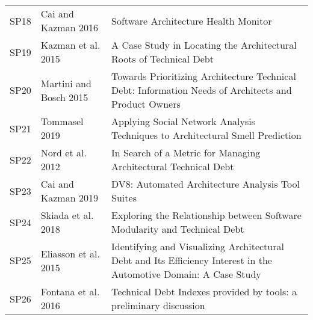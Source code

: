 \begin{tabular}{lll}
 SP18 &                                                      Cai and Kazman 2016 &                                                                                                                                      Software Architecture Health Monitor \\
 SP19 &                                                       Kazman et al. 2015 &                                                                                                        A Case Study in Locating the Architectural Roots of Technical Debt \\
 SP20 &                                                   Martini and Bosch 2015 &                                                                      Towards Prioritizing Architecture Technical Debt: Information Needs of Architects and Product Owners \\
 SP21 &                                                            Tommasel 2019 &                                                                                             Applying Social Network Analysis Techniques to Architectural Smell Prediction \\
 SP22 &                                                         Nord et al. 2012 &                                                                                                           In Search of a Metric for Managing Architectural Technical Debt \\
 SP23 &                                                      Cai and Kazman 2019 &                                                                                                                          DV8: Automated Architecture Analysis Tool Suites \\
 SP24 &                                                       Skiada et al. 2018 &                                                                                                 Exploring the Relationship between Software Modularity and Technical Debt \\
 SP25 &                                                     Eliasson et al. 2015 &                                                         Identifying and Visualizing Architectural Debt and Its Efficiency Interest in the Automotive Domain: A Case Study \\
 SP26 &                                                      Fontana et al. 2016 &                                                                                                        Technical Debt Indexes provided by tools: a preliminary discussion \\

\end{tabular}
